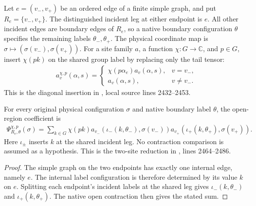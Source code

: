 \begin{definition}
    \label{def:peps_regular_edge_charge_contraction}
    \leanok
    Let $e=(v_-,v_+)$ be an ordered edge of a finite simple graph, and put
    $R_e=\{v_-,v_+\}$. The distinguished incident leg at either endpoint is $e$.
    All other incident edges are boundary edges of $R_e$, so a native boundary
    configuration $\theta$ specifies the remaining labels $\theta_-,\theta_+$.
    The physical coordinate map is
    $\sigma\mapsto(\sigma(v_-),\sigma(v_+))$.
    For a site family $a$, a function $\chi:G\to\mathbb C$, and $p\in G$, insert
    $\chi(pk)$ on the shared group label by replacing only the tail tensor:
    \begin{align}
        a^{\chi,p}_v(\alpha,s)
        =\begin{cases}
             \chi(p\alpha_e)a_v(\alpha,s), & v=v_-,    \\
             a_v(\alpha,s),                & v\ne v_-.
         \end{cases}
    \end{align}
    This is the diagonal insertion in
    \cite[Definition of chargeons]{Schuch2010PEPS}, local source lines 2432--2453.
\end{definition}

\begin{lemma}
    \label{thm:peps_regular_edge_charge_contraction}
    \leanok
    For every original physical configuration $\sigma$ and native boundary label
    $\theta$, the open-region coefficient is
    \begin{align}
        \Psi^{\chi,p}_{R_e,\theta}(\sigma)
        =\sum_{k\in G}\chi(pk)
        a_{v_-}(\iota_-(k,\theta_-),\sigma(v_-))
        a_{v_+}(\iota_+(k,\theta_+),\sigma(v_+)).
    \end{align}
    Here $\iota_\pm$ inserts $k$ at the shared incident leg. No contraction
    comparison is assumed as a hypothesis. This is the two-site reduction
    in \cite[Detection of chargeons]{Schuch2010PEPS}, lines 2464--2486.
\end{lemma}
\begin{proof}\leanok
    The simple graph on the two endpoints has exactly one internal edge, namely
    $e$. The internal label configuration is therefore determined by its value
    $k$ on $e$. Splitting each endpoint's incident labels at the shared leg gives
    $\iota_-(k,\theta_-)$ and $\iota_+(k,\theta_+)$. The native open contraction
    then gives the stated sum.
\end{proof}
